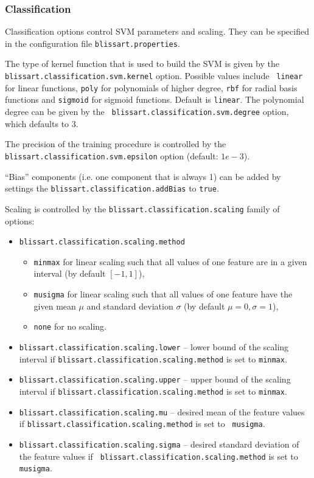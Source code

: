 \subsubsection{Classification}
\label{section:ConfigFileClassification}

Classification options control SVM parameters and scaling. They can be specified
in the configuration file {\tt blissart.properties}.

The type of kernel function that is used to build the SVM is given by the {\tt
  blissart.classification.svm.kernel} option. Possible values include {\tt
  linear} for linear functions, {\tt poly} for polynomials of higher degree,
{\tt rbf} for radial basis functions and {\tt sigmoid} for sigmoid functions.
Default is {\tt linear}. The polynomial degree can be given by the {\tt
  blissart.classification.svm.degree} option, which defaults to 3.
       
The precision of the training procedure is controlled by the {\tt
  blissart.classification.svm.epsilon} option (default: $1e-3$).
   
``Bias'' components (i.e. one component that is always 1) can be added by
settings the {\tt blissart.classification.addBias} to {\tt true}.

Scaling is controlled by the {\tt blissart.classification.scaling} family of
options:

\begin{itemize}
  \item {\tt blissart.classification.scaling.method}
    \begin{itemize}
      \item {\tt minmax} for linear scaling such that all values of one feature
        are in a given interval (by default $[-1,1]$),
      \item {\tt musigma} for linear scaling such that all values of one feature
        have the given mean $\mu$ and standard deviation $\sigma$ (by default
        $\mu = 0, \sigma = 1$),
      \item {\tt none} for no scaling.
    \end{itemize}
  \item {\tt blissart.classification.scaling.lower} -- lower bound of the
    scaling interval if {\tt blissart.classification.scaling.method} is set to
    {\tt minmax}.
  \item {\tt blissart.classification.scaling.upper} -- upper bound of the
    scaling interval if {\tt blissart.classification.scaling.method} is set to
    {\tt minmax}.
  \item {\tt blissart.classification.scaling.mu} -- desired mean of the feature
    values if {\tt blissart.classification.scaling.method} is set to {\tt
      musigma}.
  \item {\tt blissart.classification.scaling.sigma} -- desired standard
    deviation of the feature values if {\tt
      blissart.classification.scaling.method} is set to {\tt musigma}.
\end{itemize}
